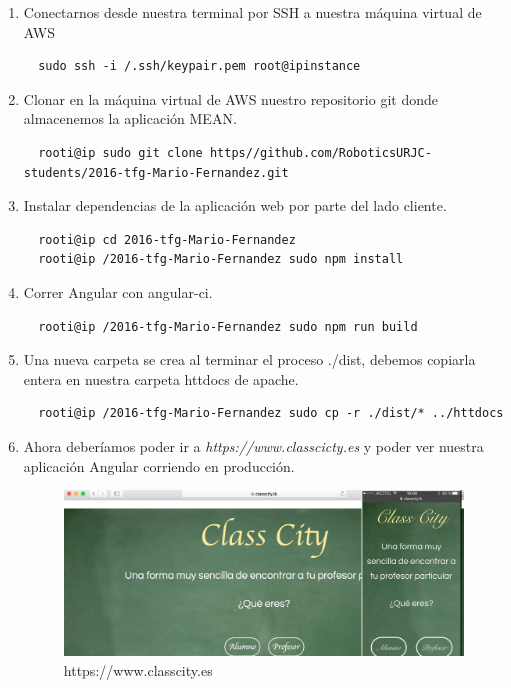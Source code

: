 \begin{enumerate}
  \item Conectarnos desde nuestra terminal por SSH a nuestra máquina virtual de AWS
  \begin{lstlisting}
  sudo ssh -i /.ssh/keypair.pem root@ipinstance
  \end{lstlisting}
  \item Clonar en la máquina virtual de AWS nuestro repositorio git donde almacenemos la aplicación MEAN.
  \begin{lstlisting}
  rooti@ip sudo git clone https//github.com/RoboticsURJC-students/2016-tfg-Mario-Fernandez.git
  \end{lstlisting}
  \item Instalar dependencias de la aplicación web por parte del lado cliente.
  \begin{lstlisting}
  rooti@ip cd 2016-tfg-Mario-Fernandez
  rooti@ip /2016-tfg-Mario-Fernandez sudo npm install
  \end{lstlisting}
  \item Correr Angular con angular-ci.
  \begin{lstlisting}
  rooti@ip /2016-tfg-Mario-Fernandez sudo npm run build
  \end{lstlisting}
  \item Una nueva carpeta se crea al terminar el proceso ./dist, debemos copiarla entera en nuestra carpeta httdocs de apache.
  \begin{lstlisting}
  rooti@ip /2016-tfg-Mario-Fernandez sudo cp -r ./dist/* ../httdocs
  \end{lstlisting}
  \item Ahora deberíamos poder ir a \textit{https://www.classcicty.es} y poder ver nuestra aplicación Angular corriendo en producción.
   \begin{figure}[!h]
  \centering
  \includegraphics[width=140mm]{img/templates/intro.png}
  \caption{https://www.classcity.es}
  \end{figure}

\end{enumerate}
